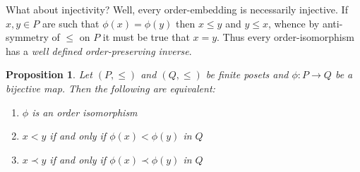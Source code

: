 \documentclass[a4paper]{article}
\newtheorem{prop}{Proposition}
\begin{document}
What about injectivity? Well, every order-embedding is necessarily injective. If $x,y\in P$ are such that $\phi(x)=\phi(y)$ then $x\leq y$ and $y\leq x$, whence by anti-symmetry of $\leq$ on $P$ it must be true that $x=y$. Thus every order-isomorphism has a \emph{well defined order-preserving inverse}.

\begin{prop} Let $(P,\leq)$ and $(Q,\leq)$ be finite posets and $\phi:P\to Q$ be a bijective map. Then the following are equivalent: \begin{enumerate}
	\item $\phi$ is an order isomorphism
	\item $x<y$ if and only if $\phi(x)<\phi(y)$ in $Q$
	\item $x\prec y$ if and only if $\phi(x)\prec \phi(y)$ in $Q$
\end{enumerate}
\end{prop}
\end{document}
